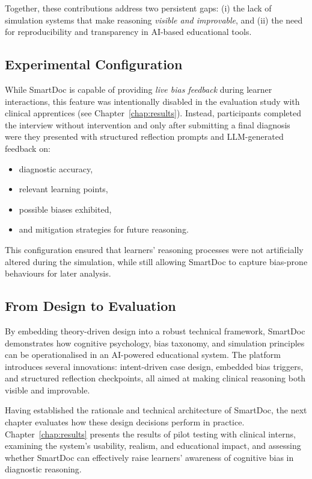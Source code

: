 Together, these contributions address two persistent gaps: (i) the lack of
simulation systems that make reasoning \emph{visible and improvable}, and (ii)
the need for reproducibility and transparency in AI-based educational tools.

\subsection{Experimental Configuration}

While SmartDoc is capable of providing \emph{live bias feedback} during learner
interactions, this feature was intentionally disabled in the evaluation study
with clinical apprentices (see Chapter~\ref{chap:results}). Instead,
participants completed the interview without intervention and only after
submitting a final diagnosis were they presented with structured reflection
prompts and LLM-generated feedback on:
\begin{itemize}
    \item diagnostic accuracy,
    \item relevant learning points,
    \item possible biases exhibited,
    \item and mitigation strategies for future reasoning.
\end{itemize}

This configuration ensured that learners’ reasoning processes were not
artificially altered during the simulation, while still allowing SmartDoc to
capture bias-prone behaviours for later analysis.

\subsection{From Design to Evaluation}

By embedding theory-driven design into a robust technical framework, SmartDoc
demonstrates how cognitive psychology, bias taxonomy, and simulation principles
can be operationalised in an AI-powered educational system. The platform
introduces several innovations: intent-driven case design, embedded bias
triggers, and structured reflection checkpoints, all aimed at making clinical
reasoning both visible and improvable.

Having established the rationale and technical architecture of SmartDoc, the
next chapter evaluates how these design decisions perform in practice.
Chapter~\ref{chap:results} presents the results of pilot testing with clinical
interns, examining the system’s usability, realism, and educational impact, and
assessing whether SmartDoc can effectively raise learners’ awareness of cognitive
bias in diagnostic reasoning.


